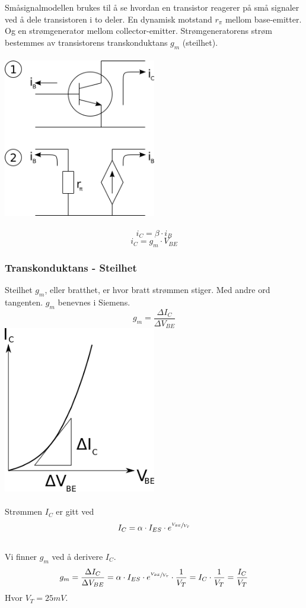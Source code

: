Småsignalmodellen brukes til å se hvordan en transistor
reagerer på små signaler ved å dele transistoren i to deler.
En dynamisk motstand $r_\pi$ mellom base-emitter.
Og en strømgenerator mellom collector-emitter.
Strømgeneratorens strøm bestemmes av transistorens
transkonduktans $g_m$ (steilhet).
\\\\
\includegraphics[width=0.5\textwidth]{./img/smasignal}
\\\\
$$i_C = \beta \cdot i_B$$
$$i_C = g_m \cdot V_{BE}$$



\subsubsection{Transkonduktans - Steilhet}
Steilhet $g_m$, eller bratthet, er hvor bratt strømmen stiger.
Med andre ord tangenten.
$g_m$ benevnes i Siemens.
$$g_m = \frac{\Delta I_C}{\Delta V_{BE}}$$
\includegraphics[width=0.5\textwidth]{./img/steilhet}
\\\\
Strømmen $I_C$ er gitt ved
$$I_C = \alpha \cdot I_{ES} \cdot e^{\sfrac{V_{BE}}{V_T}}$$
\\
Vi finner $g_m$ ved å derivere $I_C$.
$$g_m = \frac{\Delta I_C}{\Delta V_{BE}}
= \alpha \cdot I_{ES} \cdot e^{\sfrac{V_{BE}}{V_T}} \cdot \frac{1}{V_T}
= I_C \cdot \frac{1}{V_T} = \frac{I_C}{V_T}$$
Hvor $V_T = 25mV$.



